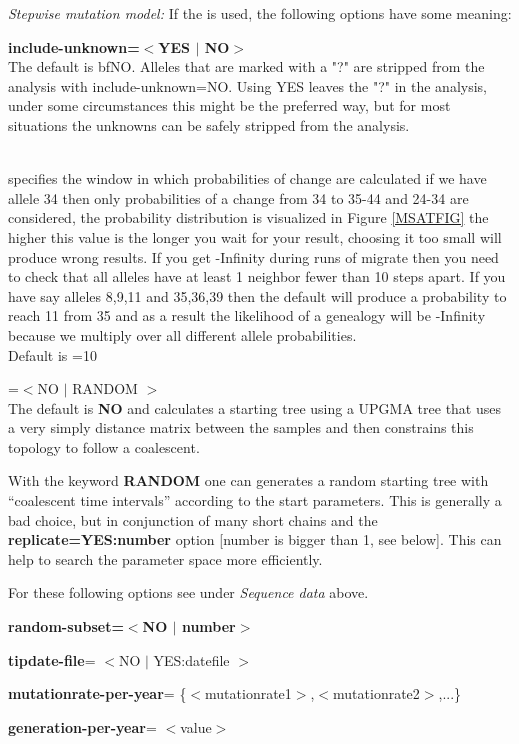 \textsl{Stepwise mutation model:}
If the {} is used, the following options have some meaning:\begin{description}
\item\textbf{{ include-unknown=$<$YES $|$ NO$>$}}\\ The default is {bf{NO}}. Alleles that are marked with a "?" are stripped from the analysis  with include-unknown=NO. Using YES leaves the "?" in the analysis, under some circumstances this might be the preferred way, but for most situations the unknowns can be safely stripped from the analysis.
 \item{}\\
specifies the window in which probabilities of change are calculated
if we have allele 34 then only probabilities of a change from 34 to 35-44
and 24-34 are considered, the probability distribution is visualized in Figure \ref{MSATFIG} the higher this value is the longer you wait for your result, choosing it too small will produce wrong results. If you get 
-Infinity during runs of migrate then you need to check that
all alleles have at least 1 neighbor fewer than 10 steps apart.
If you have say alleles 8,9,11 and 35,36,39 then the default will
produce a probability to reach 11 from 35 and as a result the 
likelihood of a genealogy will be -Infinity because we multiply over
all different allele probabilities.\\
Default is {=10}
\item{=$<$NO $|$  RANDOM $>$}\\
The default is \textbf{NO} and \migrate calculates a starting tree using a UPGMA tree that uses a very simply distance matrix between the samples and then constrains this topology to follow a coalescent. 

 With the keyword \textbf{RANDOM} one can generates a random starting tree with ``coalescent time intervals''  according to the start parameters. This is generally a bad choice,  but in conjunction of many short chains and the \textbf{ replicate=YES:number} 
option [number is bigger than 1, see below]. This can help to search the 
parameter space more efficiently.
\end{description}

For these following options see under \textsl{Sequence data} above.
\begin{description}
\item \textbf{ random-subset=$<$NO $|$ number$>$}
\item\textbf{ tipdate-file}= $<$NO $|$ YES:datefile $>$ 
\item\textbf{ mutationrate-per-year}= \{$<$mutationrate1$>$,$<$mutationrate2$>$,...\} 
\item\textbf{ generation-per-year}= $<$value$>$ 
\end{description}

